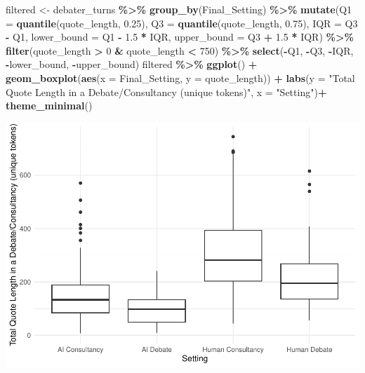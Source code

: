 \documentclass[
]{article}
\newenvironment{Shaded}{\begin{snugshade}}{\end{snugshade}}
\newcommand{\AttributeTok}[1]{\textcolor[rgb]{0.13,0.29,0.53}{#1}}
\newcommand{\DecValTok}[1]{\textcolor[rgb]{0.00,0.00,0.81}{#1}}
\newcommand{\FloatTok}[1]{\textcolor[rgb]{0.00,0.00,0.81}{#1}}
\newcommand{\FunctionTok}[1]{\textcolor[rgb]{0.13,0.29,0.53}{\textbf{#1}}}
\newcommand{\NormalTok}[1]{#1}
\newcommand{\OtherTok}[1]{\textcolor[rgb]{0.56,0.35,0.01}{#1}}
\newcommand{\SpecialCharTok}[1]{\textcolor[rgb]{0.81,0.36,0.00}{\textbf{#1}}}
\newcommand{\StringTok}[1]{\textcolor[rgb]{0.31,0.60,0.02}{#1}}
\begin{document}
\begin{Shaded}
\begin{Highlighting}[]
\NormalTok{filtered }\OtherTok{\textless{}{-}}\NormalTok{ debater\_turns }\SpecialCharTok{\%\textgreater{}\%}
  \FunctionTok{group\_by}\NormalTok{(Final\_Setting) }\SpecialCharTok{\%\textgreater{}\%}
  \FunctionTok{mutate}\NormalTok{(}\AttributeTok{Q1 =} \FunctionTok{quantile}\NormalTok{(quote\_length, }\FloatTok{0.25}\NormalTok{),}
         \AttributeTok{Q3 =} \FunctionTok{quantile}\NormalTok{(quote\_length, }\FloatTok{0.75}\NormalTok{),}
         \AttributeTok{IQR =}\NormalTok{ Q3 }\SpecialCharTok{{-}}\NormalTok{ Q1,}
         \AttributeTok{lower\_bound =}\NormalTok{ Q1 }\SpecialCharTok{{-}} \FloatTok{1.5} \SpecialCharTok{*}\NormalTok{ IQR,}
         \AttributeTok{upper\_bound =}\NormalTok{ Q3 }\SpecialCharTok{+} \FloatTok{1.5} \SpecialCharTok{*}\NormalTok{ IQR) }\SpecialCharTok{\%\textgreater{}\%}
  \FunctionTok{filter}\NormalTok{(quote\_length }\SpecialCharTok{\textgreater{}} \DecValTok{0} \SpecialCharTok{\&}\NormalTok{ quote\_length }\SpecialCharTok{\textless{}} \DecValTok{750}\NormalTok{) }\SpecialCharTok{\%\textgreater{}\%}
  \FunctionTok{select}\NormalTok{(}\SpecialCharTok{{-}}\NormalTok{Q1, }\SpecialCharTok{{-}}\NormalTok{Q3, }\SpecialCharTok{{-}}\NormalTok{IQR, }\SpecialCharTok{{-}}\NormalTok{lower\_bound, }\SpecialCharTok{{-}}\NormalTok{upper\_bound) }
\NormalTok{filtered }\SpecialCharTok{\%\textgreater{}\%}
  \FunctionTok{ggplot}\NormalTok{() }\SpecialCharTok{+}
  \FunctionTok{geom\_boxplot}\NormalTok{(}\FunctionTok{aes}\NormalTok{(}\AttributeTok{x =}\NormalTok{ Final\_Setting, }\AttributeTok{y =}\NormalTok{ quote\_length)) }\SpecialCharTok{+}
  \FunctionTok{labs}\NormalTok{(}\AttributeTok{y =} \StringTok{"Total Quote Length in a Debate/Consultancy (unique tokens)"}\NormalTok{, }\AttributeTok{x =} \StringTok{"Setting"}\NormalTok{)}\SpecialCharTok{+}
  \FunctionTok{theme\_minimal}\NormalTok{()}
\end{Highlighting}
\end{Shaded}

\includegraphics[width=1\linewidth]{debate-2309_files/figure-latex/quote_length graph-4}
\end{document}
